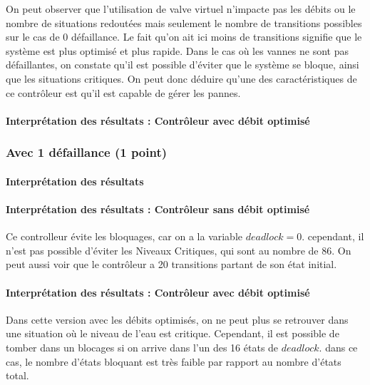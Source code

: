 \documentclass[a4paper]{book}
\begin{document}
On peut observer que l'utilisation de valve virtuel n'impacte pas les débits ou le nombre de situations redoutées mais seulement le nombre de transitions possibles sur le cas de 0 défaillance.
Le fait qu'on ait ici moins de transitions signifie que le système est plus optimisé et plus rapide.
Dans le cas où les vannes ne sont pas défaillantes, on constate qu’il est possible d’éviter que le système se bloque, ainsi que les situations critiques.
On peut donc déduire qu’une des caractéristiques de ce contrôleur est qu’il est capable de gérer les pannes.


\paragraph{Interprétation des résultats : Contrôleur avec débit optimisé}

\subsubsection{Avec 1 défaillance (1 point)}


%
%
%
\paragraph{Interprétation des résultats}
\paragraph{Interprétation des résultats : Contrôleur sans débit optimisé}
Ce controlleur évite les bloquages, car on a la variable $deadlock = 0$. cependant, il n'est pas possible d'éviter les Niveaux Critiques, qui sont au nombre de 86.
On peut aussi voir que le contrôleur a 20 transitions partant de son état initial.

\paragraph{Interprétation des résultats : Contrôleur avec débit optimisé}
Dans cette version avec les débits optimisés, on ne peut plus se retrouver dans une situation où le niveau de l'eau est critique. Cependant, il est possible de tomber dans un blocages si on arrive dans l'un des 16 états de $deadlock$.
dans ce cas, le nombre d'états bloquant est très faible par rapport au nombre d'états total.
\end{document}

